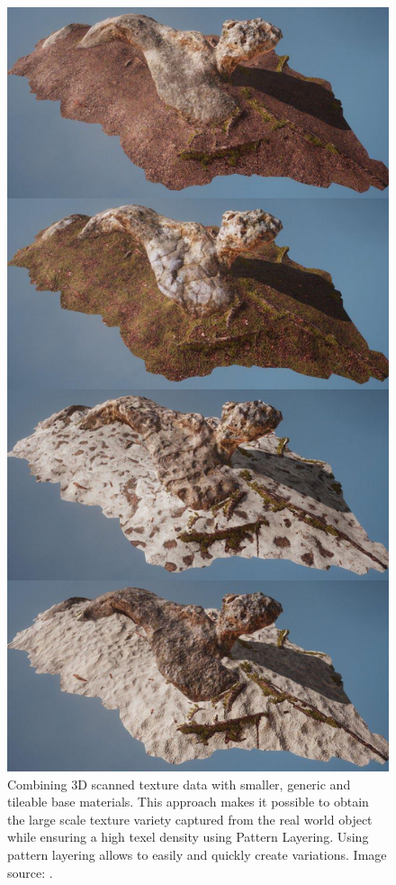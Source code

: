\begin{figure}
	\centering
	\includegraphics[width=0.65\linewidth]{images/07cha_03_layeredLitUnity.jpg}
	\caption{Combining 3D scanned texture data with smaller, generic and tileable base materials. This approach makes it possible to obtain the large scale texture variety captured from the real world object while ensuring a high texel density using Pattern Layering. Using pattern layering allows to easily and quickly create variations. Image source: \cite[p.\,6]{unity2017photogrammetryLayered}.
	}%
	\label{fig:layerdLitUnity}
\end{figure}



\section{\patCatAlternatives}\label{\patCatAlternatives}

